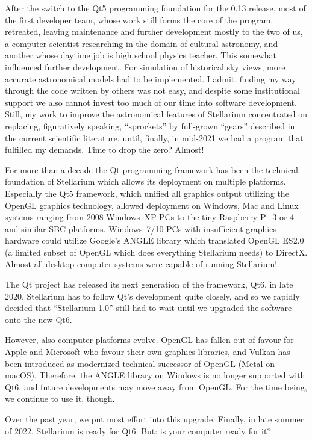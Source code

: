 After the switch to the Qt5 programming foundation for the 0.13
release, most of the first developer team, whose work still forms the
core of the program, retreated, leaving maintenance and further
development mostly to the two of us, a computer scientist researching
in the domain of cultural astronomy, and another whose daytime job is
high school physics teacher. This somewhat influenced further
development. For simulation of historical sky views, more accurate
astronomical models had to be implemented. I admit, finding my way
through the code written by others was not easy, and despite some
institutional support we also cannot invest too much of our time into
software development. Still, my work to improve the astronomical
features of Stellarium concentrated on replacing, figuratively
speaking, ``sprockets'' by full-grown ``gears'' described in the
current scientific literature, until, finally, in mid-2021 we had a
program that fulfilled my demands. Time to drop the zero? Almost!

For more than a decade the Qt programming framework has been the
technical foundation of Stellarium which allows its deployment on
multiple platforms. Especially the Qt5 framework, which unified all
graphics output utilizing the OpenGL graphics technology, allowed
deployment on Windows, Mac and Linux systems ranging from 2008
Windows~XP PCs to the tiny Raspberry Pi~3 or 4 and similar SBC platforms. Windows~7/10
PCs with insufficient graphics hardware could utilize Google's ANGLE
library which translated OpenGL ES2.0 (a limited subset of OpenGL
which does everything Stellarium needs) to DirectX. Almost all desktop
computer systems were capable of running Stellarium!

The Qt project has released its next generation of the framework, Qt6,
in late 2020. Stellarium has to follow Qt's development quite closely,
and so we rapidly decided that ``Stellarium 1.0'' still had to wait
until we upgraded the software onto the new Qt6.

However, also computer platforms evolve. OpenGL has fallen out of
favour for Apple and Microsoft who favour their own graphics
libraries, and Vulkan has been introduced as modernized technical
successor of OpenGL (Metal on macOS). Therefore, the ANGLE library on Windows is no
longer supported with Qt6, and future developments may move away from
OpenGL. For the time being, we continue to use it, though.

Over the past year, we put most effort into this upgrade. Finally, in
late summer of 2022, Stellarium is ready for Qt6. But: is your computer
ready for it?

